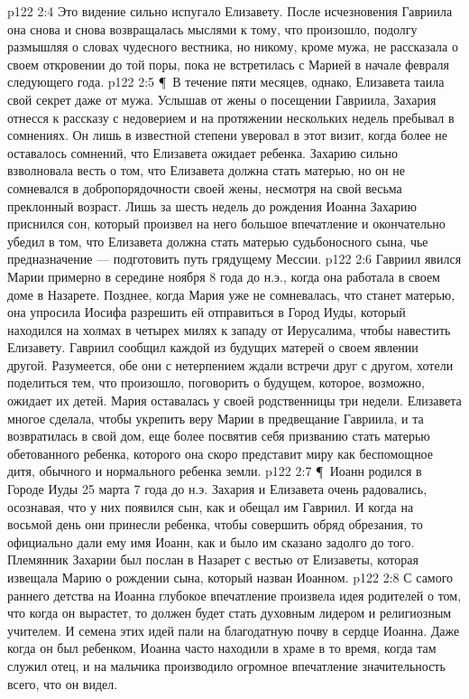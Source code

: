 \vs p122 2:4 Это видение сильно испугало Елизавету. После исчезновения Гавриила она снова и снова возвращалась мыслями к тому, что произошло, подолгу размышляя о словах чудесного вестника, но никому, кроме мужа, не рассказала о своем откровении до той поры, пока не встретилась с Марией в начале февраля следующего года.
\vs p122 2:5 \P\ В течение пяти месяцев, однако, Елизавета таила свой секрет даже от мужа. Услышав от жены о посещении Гавриила, Захария отнесся к рассказу с недоверием и на протяжении нескольких недель пребывал в сомнениях. Он лишь в известной степени уверовал в этот визит, когда более не оставалось сомнений, что Елизавета ожидает ребенка. Захарию сильно взволновала весть о том, что Елизавета должна стать матерью, но он не сомневался в добропорядочности своей жены, несмотря на свой весьма преклонный возраст. Лишь за шесть недель до рождения Иоанна Захарию приснился сон, который произвел на него большое впечатление и окончательно убедил в том, что Елизавета должна стать матерью судьбоносного сына, чье предназначение --- подготовить путь грядущему Мессии.
\vs p122 2:6 Гавриил явился Марии примерно в середине ноября 8 года до н.э., когда она работала в своем доме в Назарете. Позднее, когда Мария уже не сомневалась, что станет матерью, она упросила Иосифа разрешить ей отправиться в Город Иуды, который находился на холмах в четырех милях к западу от Иерусалима, чтобы навестить Елизавету. Гавриил сообщил каждой из будущих матерей о своем явлении другой. Разумеется, обе они с нетерпением ждали встречи друг с другом, хотели поделиться тем, что произошло, поговорить о будущем, которое, возможно, ожидает их детей. Мария оставалась у своей родственницы три недели. Елизавета многое сделала, чтобы укрепить веру Марии в предвещание Гавриила, и та возвратилась в свой дом, еще более посвятив себя призванию стать матерью обетованного ребенка, которого она скоро представит миру как беспомощное дитя, обычного и нормального ребенка земли.
\vs p122 2:7 \P\ Иоанн родился в Городе Иуды 25 марта 7 года до н.э. Захария и Елизавета очень радовались, осознавая, что у них появился сын, как и обещал им Гавриил. И когда на восьмой день они принесли ребенка, чтобы совершить обряд обрезания, то официально дали ему имя Иоанн, как и было им сказано задолго до того. Племянник Захарии был послан в Назарет с вестью от Елизаветы, которая извещала Марию о рождении сына, который назван Иоанном.
\vs p122 2:8 С самого раннего детства на Иоанна глубокое впечатление произвела идея родителей о том, что когда он вырастет, то должен будет стать духовным лидером и религиозным учителем. И семена этих идей пали на благодатную почву в сердце Иоанна. Даже когда он был ребенком, Иоанна часто находили в храме в то время, когда там служил отец, и на мальчика производило огромное впечатление значительность всего, что он видел.
